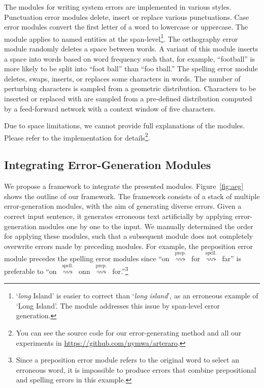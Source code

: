 \documentclass[11pt]{article}
\begin{document}
The modules for writing system errors are implemented in various styles.
Punctuation error modules delete, insert or replace various punctuations.
Case error modules convert the first letter of a word to lowercase or uppercase.
The module applies to named entities at the span-level\footnote{
	`\textit{long} Island' is easier to correct than `\textit{long island}', as an erroneous example of `Long Island'.
	The module addresses this issue by span-level error generation.}.
The orthography error module randomly deletes a space between words.
A variant of this module inserts a space into words based on word frequency such that, for example, ``football'' is more likely to be split into ``foot ball'' than ``foo tball.''
The spelling error module deletes, swaps, inserts, or replaces some characters in words.
The number of perturbing characters is sampled from a geometric distribution.
Characters to be inserted or replaced with are sampled from a pre-defined distribution computed by a feed-forward network with a context window of five characters.

Due to space limitations, we cannot provide full explanations of the modules. Please refer to the implementation for details\footnote{
	You can see the source code for our error-generating method and all our experiments in \url{https://github.com/nymwa/arteraro}.}.

\subsection{Integrating Error-Generation Modules}

We propose a framework to integrate the presented modules.
Figure~\ref{fig:aeg} shows the outline of our framework.
The framework consists of a stack of multiple error-generation modules, with the aim of generating diverse errors.
Given a correct input sentence, it generates erroneous text artificially by applying error-generation modules one by one to the input.
We manually determined the order for applying these modules, such that a subsequent module does not completely overwrite errors made by preceding modules.
For example, the preposition error module precedes the spelling error modules since
\mbox{``on $\overset{\text{prep.}}{\rightsquigarrow}$ for $\overset{\text{spell.}}{\rightsquigarrow}$ far''}
is preferable to
\mbox{``on $\overset{\text{spell.}}{\rightsquigarrow}$ onn $\overset{\text{prep.}}{\rightsquigarrow}$ for.''}\footnote{
	Since a preposition error module refers to the original word to select an erroneous word,
	it is impossible to produce errors that combine prepositional and spelling errors in this example.}
\end{document}
